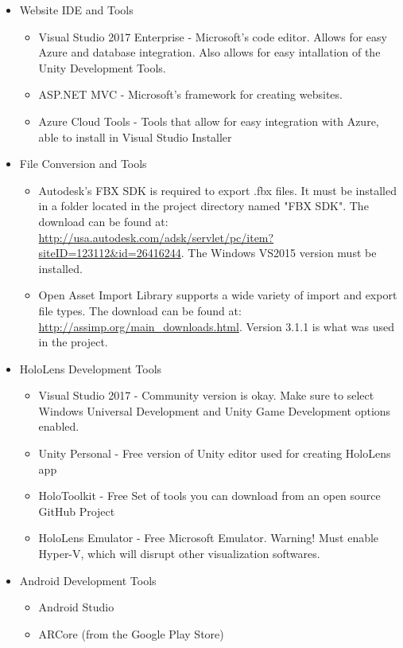 \begin{itemize}

    \item Website IDE and Tools
    \begin{itemize}
        \item Visual Studio 2017 Enterprise - Microsoft's code editor. Allows for easy Azure and database
        integration. Also allows for easy intallation of the Unity Development Tools.
        \item ASP.NET MVC - Microsoft's framework for creating websites.
        \item Azure Cloud Tools - Tools that allow for easy integration with Azure, able to install in Visual Studio Installer
    \end{itemize}

    \item File Conversion and Tools
    \begin{itemize}
        \item Autodesk's FBX SDK is required to export .fbx files.  It must be installed in a folder located in the project directory named "FBX SDK".  The download can be found at: 
        \url{http://usa.autodesk.com/adsk/servlet/pc/item?siteID=123112&id=26416244}.
        The Windows VS2015 version must be installed.

        \item Open Asset Import Library supports a wide variety of import and export file types.  The download can be found at: \url{http://assimp.org/main_downloads.html}.  Version 3.1.1 is what was used in the project.         
    \end{itemize}

    \item HoloLens Development Tools
    \begin{itemize}
        \item Visual Studio 2017 - Community version is okay. Make sure to select Windows Universal Development and Unity Game Development options enabled.

        \item Unity Personal - Free version of Unity editor used for creating HoloLens app

        \item HoloToolkit - Free Set of tools you can download from an open source GitHub Project

        \item HoloLens Emulator - Free Microsoft Emulator. Warning! Must enable Hyper-V, which will disrupt other visualization softwares.

    \end{itemize}

    \item Android Development Tools
    \begin{itemize}
        \item Android Studio
        \item ARCore (from the Google Play Store)
    \end{itemize}
\end{itemize}


